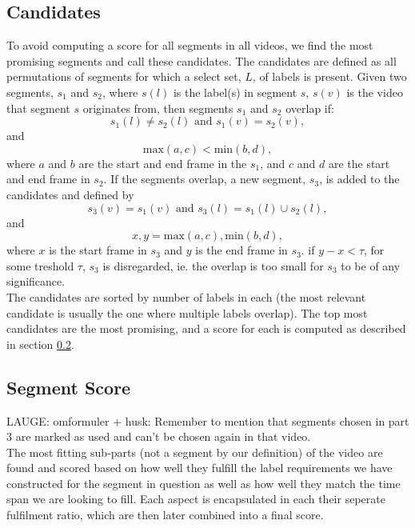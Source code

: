\subsection{Candidates}\label{sec:candidates}
%
To avoid computing a score for all segments in all videos, we find the most promising segments and call these candidates. The candidates are defined as all permutations of segments for which a select set, $L$, of labels is present.
Given two segments, $s_1$ and $s_2$, where $s(l)$ is the label(s) in segment $s$, $s(v)$ is the video that segment $s$ originates from, then segments $s_1$ and $s_2$ overlap if:
\[
s_1(l) \neq s_2(l) \text{ and }
s_1(v) = s_2(v),
\]
and
%
\[
\text{max}(a, c) < \text{min}(b, d),
\]
%
where $a$ and $b$ are the start and end frame in the $s_1$, and $c$ and $d$ are the start and end frame in $s_2$. If the segments overlap, a new segment, $s_3$, is added to the candidates and defined by
%
\[
s_3(v) = s_1(v) \text{ and }
s_3(l) = s_1(l) \cup s_2(l),
\]
%
and
%
\[
x,y = \text{max}(a, c), \text{min}(b, d),
\]
%
where $x$ is the start frame in $s_3$ and $y$ is the end frame in $s_3$. if $y-x < \tau$, for some treshold $\tau$, $s_3$ is disregarded, ie. the overlap is too small for $s_3$ to be of any significance.\\
The candidates are sorted by number of labels in each (the most relevant candidate is usually the one where multiple labels overlap). The top most candidates are the most promising, and a score for each is computed as described in section \ref{sec:segment_score}.
%
%
\subsection{Segment Score}\label{sec:segment_score}
%
LAUGE: omformuler + husk: Remember to mention that segments chosen in part 3 are marked as used and can't be chosen again in that video.\\
The most fitting sub-parts (not a segment by our definition) of the video are found and scored based on how well they fulfill the label requirements we have constructed for the segment in question as well as how well they match the time span we are looking to fill. Each aspect is encapsulated in each their seperate fulfilment ratio, which are then later combined into a final score.
%

